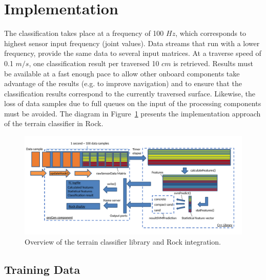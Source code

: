 \documentclass{article}
\begin{document}
\section{Implementation}
The classification takes place at a frequency of 100 $Hz$, which corresponds to highest sensor input frequency (joint values). Data streams that run with a lower frequency, provide the same data to several input matrices. At a traverse speed of 0.1 $m/s$, one classification result per traversed 10 $cm$ is retrieved.  
Results must be available at a fast enough pace to allow other onboard components take advantage of the results (e.g. to improve navigation) and to ensure that the classification results correspond to the currently traversed surface. Likewise, the loss of data samples due to full queues on the input of the processing components must be avoided. The diagram in Figure~\ref{fig:overview} presents the implementation approach of the terrain classifier in Rock.

\begin{figure}[h]
\centering
\includegraphics[width=\textwidth]{../figures/OverviewTC2.pdf}
\caption{\label{fig:overview}Overview of the terrain classifier library and Rock integration.}
\end{figure}

\subsection{Training Data}
\end{document}
